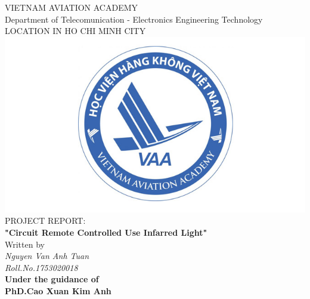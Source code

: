 \documentclass[10pt, a4paper]{report}
\begin{document}
    \centering
    \LARGE{\textsc{VIETNAM AVIATION ACADEMY}} \\
    \vspace{3mm}
    \normalsize{Department of Telecomunication - Electronics Engineering Technology} \\
    \vspace{3mm}
    \large{LOCATION IN HO CHI MINH CITY} \\
    \vspace{3mm}
    \includegraphics[scale=0.3]{download.jpg} \\
    \vspace{3mm}
    \normalsize{PROJECT REPORT:} \\
    \vspace{15mm}
    \huge{\textbf{"Circuit Remote Controlled Use Infarred Light"}} \\
    \vspace{20mm}
    \normalsize{Written by} \\
    \vspace{3mm}
    \large{\textit{Nguyen Van Anh Tuan}} \\ 
    \vspace{3mm}
    \textit{\large{Roll.No.1753020018}} \\
    \vspace{15mm}
    \textbf{\large{Under the guidance of}} \\
    \vspace{10mm}
    \textbf{\large{PhD.Cao Xuan Kim Anh}}
    \pagestyle{fancy}
    \fancyhf{}
    \fancyfoot[CE,CO]{\leftmark}
    \fancyfoot[LE,RO]{\thepage}
    \renewcommand{\headrulewidth}{2pt}
    \renewcommand{\footrulewidth}{1pt}
\end{document}
